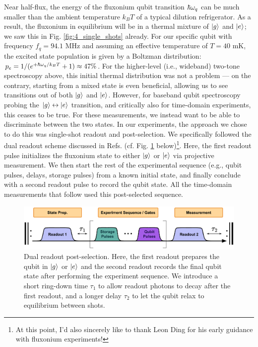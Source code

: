 Near half-flux, the energy of the fluxonium qubit transition $\hbar\omega_q$ can be much smaller than the ambient temperature $k_BT$ of a typical dilution refrigerator. As a result, the fluxonium in equilibrium will be in a thermal mixture of $\lvert g\rangle$ and $\lvert e\rangle$; we saw this in Fig. \ref{fig:4_single_shots} already. For our specific qubit with frequency $f_q = 94.1$ MHz and assuming an effective temperature of $T = 40$ mK, the excited state population is given by a Boltzman distribution: $p_e = 1 / (e^{+\hbar\omega_q/k_B T} + 1) \approx 47\%$. For the higher-level (i.e., wideband) two-tone spectroscopy above, this initial thermal distribution was not a problem --- on the contrary, starting from a mixed state is even beneficial, allowing us to see transitions out of both $\lvert g\rangle$ and $\lvert e\rangle$. However, for baseband qubit spectroscopy probing the $\lvert g\rangle\leftrightarrow\lvert e\rangle$ transition, and critically also for time-domain experiments, this ceases to be true. For these measurements, we instead want to be able to discriminate between the two states. In our experiments, the approach we chose to do this was single-shot readout and post-selection. We specifically followed the dual readout scheme discussed in Refs. \cite{ding2023FTF, ding2023thesis} (cf. Fig. \ref{fig:4_postselection} below)\footnote{At this point, I'd also sincerely like to thank Leon Ding for his early guidance with fluxonium experiments!}. Here, the first readout pulse initializes the fluxonium state to either $\lvert g\rangle$ or $\lvert e\rangle$ via projective measurement. We then start the rest of the experimental sequence (e.g., qubit pulses, delays, storage pulses) from a known initial state, and finally conclude with a second readout pulse to record the qubit state. All the time-domain measurements that follow used this post-selected sequence. 

\begin{figure}[h]
    \centering
    \includegraphics[width=0.9\linewidth]{Figures/4/postselection.pdf}
    \caption[Dual-readout post-selection sequence used for time-domain experiments in this thesis.]{Dual readout post-selection. Here, the first readout prepares the qubit in $\lvert g\rangle$ or $\lvert e\rangle$ and the second readout records the final qubit state after performing the experiment sequence. We introduce a short ring-down time $\tau_1$ to allow readout photons to decay after the first readout, and a longer delay $\tau_2$ to let the qubit relax to equilibrium between shots.}
    \label{fig:4_postselection}
\end{figure}

